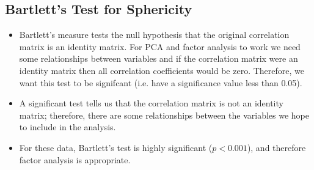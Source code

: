 \documentclass[a4paper,12pt]{article}
\begin{document}
\subsection{Bartlett's Test for Sphericity}
\begin{itemize}
	\item
Bartlett's measure tests the null hypothesis that the original correlation matrix is an identity
matrix. For PCA and factor analysis to work we need some relationships between variables and if the correlation
matrix were an identity matrix then all correlation coefficients would be zero. Therefore, we
want this test to be signifcant (i.e. have a significance value less than 0.05). 
\item A significant test
tells us that the correlation matrix is not an identity matrix; therefore, there are some relationships
between the variables we hope to include in the analysis. 
\item For these data, Bartlett's test is
highly significant ($p < 0.001$), and therefore factor analysis is appropriate.
\end{itemize}
\end{document}
